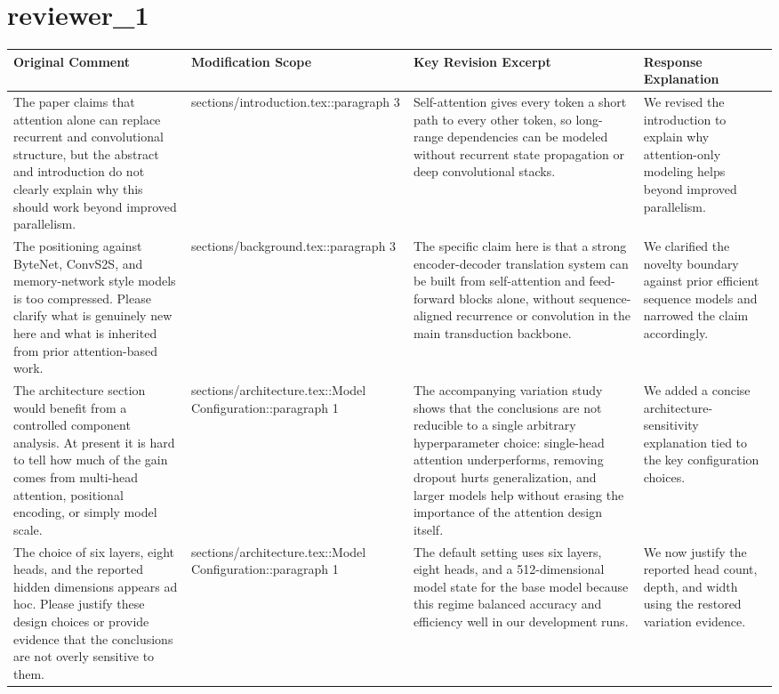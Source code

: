 \documentclass{article}
\begin{document}
\section*{ reviewer\_1 }
\begin{longtable}{|p{}|p{}|p{}|p{}|}
\hline
Original Comment & Modification Scope & Key Revision Excerpt & Response Explanation \\
\hline
The paper claims that attention alone can replace recurrent and convolutional structure, but the abstract and introduction do not clearly explain why this should work beyond improved parallelism. & sections/introduction.tex::paragraph 3 & Self-attention gives every token a short path to every other token, so long-range dependencies can be modeled without recurrent state propagation or deep convolutional stacks. & We revised the introduction to explain why attention-only modeling helps beyond improved parallelism. \\
\hline
The positioning against ByteNet, ConvS2S, and memory-network style models is too compressed. Please clarify what is genuinely new here and what is inherited from prior attention-based work. & sections/background.tex::paragraph 3 & The specific claim here is that a strong encoder-decoder translation system can be built from self-attention and feed-forward blocks alone, without sequence-aligned recurrence or convolution in the main transduction backbone. & We clarified the novelty boundary against prior efficient sequence models and narrowed the claim accordingly. \\
\hline
The architecture section would benefit from a controlled component analysis. At present it is hard to tell how much of the gain comes from multi-head attention, positional encoding, or simply model scale. & sections/architecture.tex::Model Configuration::paragraph 1 & The accompanying variation study shows that the conclusions are not reducible to a single arbitrary hyperparameter choice: single-head attention underperforms, removing dropout hurts generalization, and larger models help without erasing the importance of the attention design itself. & We added a concise architecture-sensitivity explanation tied to the key configuration choices. \\
\hline
The choice of six layers, eight heads, and the reported hidden dimensions appears ad hoc. Please justify these design choices or provide evidence that the conclusions are not overly sensitive to them. & sections/architecture.tex::Model Configuration::paragraph 1 & The default setting uses six layers, eight heads, and a 512-dimensional model state for the base model because this regime balanced accuracy and efficiency well in our development runs. & We now justify the reported head count, depth, and width using the restored variation evidence. \\

\end{longtable}
\end{document}
